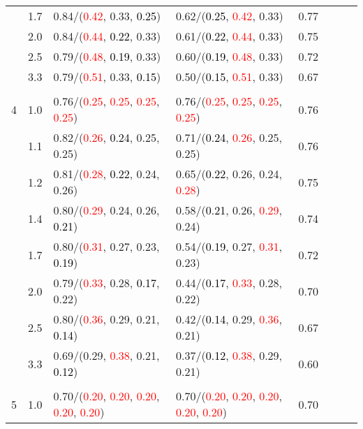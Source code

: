 \documentclass[10pt,a4paper]{report}
\begin{document}
\begin{table}[!htbp]
\begin{center}
{\begin{tabular}{ccllcccc}
			&1.7&0.84/(\textcolor{red}{0.42}, 0.33, \textcolor{black}{0.25})&0.62/(\textcolor{black}{0.25}, \textcolor{red}{0.42}, 0.33)&0.77\\
			&2.0&0.84/(\textcolor{red}{0.44}, \textcolor{black}{0.22}, 0.33)&0.61/(\textcolor{black}{0.22}, \textcolor{red}{0.44}, 0.33)&0.75\\
			&2.5&0.79/(\textcolor{red}{0.48}, \textcolor{black}{0.19}, 0.33)&0.60/(\textcolor{black}{0.19}, \textcolor{red}{0.48}, 0.33)&0.72\\
			&3.3&0.79/(\textcolor{red}{0.51}, 0.33, \textcolor{black}{0.15})&0.50/(\textcolor{black}{0.15}, \textcolor{red}{0.51}, 0.33)&0.67\\
			&&&&\\
			4			&1.0&0.76/(\textcolor{red}{0.25}, \textcolor{red}{0.25}, \textcolor{red}{0.25}, \textcolor{red}{0.25})&0.76/(\textcolor{red}{0.25}, \textcolor{red}{0.25}, \textcolor{red}{0.25}, \textcolor{red}{0.25})&0.76\\
			&1.1&0.82/(\textcolor{red}{0.26}, \textcolor{black}{0.24}, 0.25, 0.25)&0.71/(\textcolor{black}{0.24}, \textcolor{red}{0.26}, 0.25, 0.25)&0.76\\
			&1.2&0.81/(\textcolor{red}{0.28}, \textcolor{black}{0.22}, 0.24, 0.26)&0.65/(\textcolor{black}{0.22}, 0.26, 0.24, \textcolor{red}{0.28})&0.75\\
			&1.4&0.80/(\textcolor{red}{0.29}, 0.24, 0.26, \textcolor{black}{0.21})&0.58/(\textcolor{black}{0.21}, 0.26, \textcolor{red}{0.29}, 0.24)&0.74\\
			&1.7&0.80/(\textcolor{red}{0.31}, 0.27, 0.23, \textcolor{black}{0.19})&0.54/(\textcolor{black}{0.19}, 0.27, \textcolor{red}{0.31}, 0.23)&0.72\\
			&2.0&0.79/(\textcolor{red}{0.33}, 0.28, \textcolor{black}{0.17}, 0.22)&0.44/(\textcolor{black}{0.17}, \textcolor{red}{0.33}, 0.28, 0.22)&0.70\\
			&2.5&0.80/(\textcolor{red}{0.36}, 0.29, 0.21, \textcolor{black}{0.14})&0.42/(\textcolor{black}{0.14}, 0.29, \textcolor{red}{0.36}, 0.21)&0.67\\
			&3.3&0.69/(0.29, \textcolor{red}{0.38}, 0.21, \textcolor{black}{0.12})&0.37/(\textcolor{black}{0.12}, \textcolor{red}{0.38}, 0.29, 0.21)&0.60\\
			&&&&\\
			5			&1.0&0.70/(\textcolor{red}{0.20}, \textcolor{red}{0.20}, \textcolor{red}{0.20}, \textcolor{red}{0.20}, \textcolor{red}{0.20})&0.70/(\textcolor{red}{0.20}, \textcolor{red}{0.20}, \textcolor{red}{0.20}, \textcolor{red}{0.20}, \textcolor{red}{0.20})&0.70\\

\end{tabular}}
\end{center}
\end{table}
\end{document}
